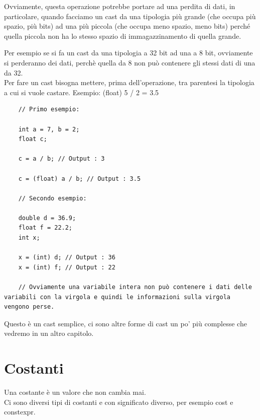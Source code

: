 \textsf{\small Ovviamente, questa operazione potrebbe portare ad una perdita di dati, in particolare, quando facciamo un cast da una tipologia più grande (che occupa più spazio, più bits) ad una più piccola (che occupa meno spazio, meno bits) perché quella piccola non ha lo stesso spazio di immagazzinamento di quella grande.} 

\textsf{\small Per esempio se si fa un cast da una tipologia a 32 bit ad una a 8 bit, ovviamente si perderanno dei dati, perchè quella da 8 non può contenere gli stessi dati di una da 32.} \\

\textsf{\small Per fare un cast bisogna mettere, prima dell'operazione, tra parentesi la tipologia a cui si vuole castare. Esempio: (float) 5 / 2 = 3.5} \\

\begin{lstlisting}
	// Primo esempio:
	
	int a = 7, b = 2;
	float c;
	
	c = a / b; // Output : 3
	
	c = (float) a / b; // Output : 3.5
	
	// Secondo esempio:
	
	double d = 36.9;
	float f = 22.2;
	int x;
	
	x = (int) d; // Output : 36
	x = (int) f; // Output : 22
	
	// Ovviamente una variabile intera non può contenere i dati delle variabili con la virgola e quindi le informazioni sulla virgola vengono perse.
\end{lstlisting}

\textsf{\small Questo è un cast semplice, ci sono altre forme di cast un po' più complesse che vedremo in un altro capitolo.} \\


\newpage

\section{Costanti}

\textsf{\small Una costante è un valore che non cambia mai.}\\

\textsf{\small Ci sono diversi tipi di costanti e con significato diverso, per esempio \color{myblue2} cost \normalcolor e \color{myblue2} constexpr. \normalcolor}\\

